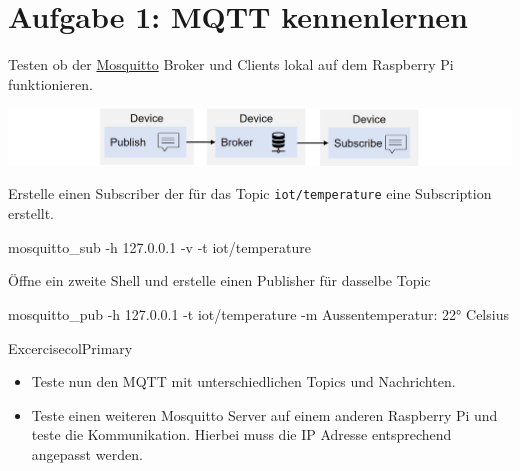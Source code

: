 \documentclass[
  11pt,
  a4paper,
  oneside, openany  ,captions=tableheading
]{scrbook}
\newenvironment{Shaded}{\begin{snugshade}}{\end{snugshade}}
\newcommand{\AttributeTok}[1]{\textcolor[rgb]{0.40,0.45,0.13}{#1}}
\newcommand{\ExtensionTok}[1]{\textcolor[rgb]{0.00,0.23,0.31}{#1}}
\newcommand{\NormalTok}[1]{\textcolor[rgb]{0.00,0.23,0.31}{#1}}
\newcommand{\StringTok}[1]{\textcolor[rgb]{0.13,0.47,0.30}{#1}}
\providecommand{\tightlist}{%
  \setlength{\itemsep}{0pt}\setlength{\parskip}{0pt}}
\theoremstyle{remark}
\renewcommand{\markright}[1]{\def\chaptertitle{#1}} %
\begin{document}
\section*{Aufgabe 1: MQTT
kennenlernen}\label{aufgabe-1-mqtt-kennenlernen}

\markright{Aufgabe 1: MQTT kennenlernen}

Testen ob der \href{https://mosquitto.org}{Mosquitto} Broker und Clients
lokal auf dem Raspberry Pi funktionieren.

\includegraphics{images/mqtt-publish-subscribe.jpg}

Erstelle einen Subscriber der für das Topic \texttt{iot/temperature}
eine Subscription erstellt.

\begin{Shaded}
\begin{Highlighting}[]
\ExtensionTok{mosquitto\_sub} \AttributeTok{{-}h}\NormalTok{ 127.0.0.1 }\AttributeTok{{-}v} \AttributeTok{{-}t} \StringTok{\textquotesingle{}iot/temperature\textquotesingle{}}
\end{Highlighting}
\end{Shaded}

Öffne ein zweite Shell und erstelle einen Publisher für dasselbe Topic

\begin{Shaded}
\begin{Highlighting}[]
\ExtensionTok{mosquitto\_pub} \AttributeTok{{-}h}\NormalTok{ 127.0.0.1 }\AttributeTok{{-}t} \StringTok{\textquotesingle{}iot/temperature\textquotesingle{}} \AttributeTok{{-}m} \StringTok{\textquotesingle{}Aussentemperatur: 22° Celsius\textquotesingle{}}
\end{Highlighting}
\end{Shaded}

\begin{boxtitle}{Excercise}{colPrimary}

\begin{itemize}
\tightlist
\item
  Teste nun den MQTT mit unterschiedlichen Topics und Nachrichten.
\item
  Teste einen weiteren Mosquitto Server auf einem anderen Raspberry Pi
  und teste die Kommunikation. Hierbei muss die IP Adresse entsprechend
  angepasst werden.
\end{itemize}

\end{boxtitle}
\end{document}
